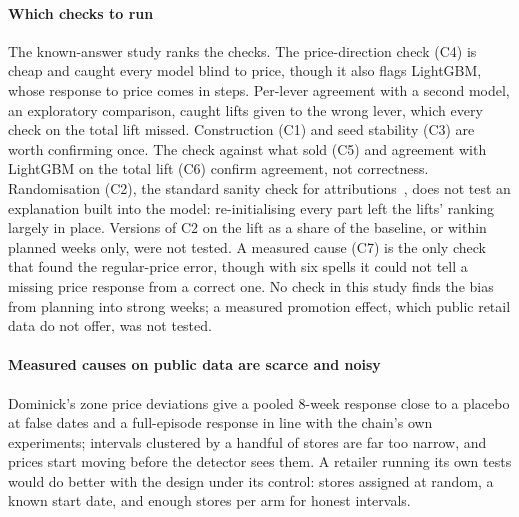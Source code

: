 \paragraph{Which checks to run}
The known-answer study ranks the checks. The price-direction check (C4) is cheap
and caught every model blind to price, though it also flags LightGBM, whose
response to price comes in steps. Per-lever agreement with a second model, an
exploratory comparison, caught lifts given to the wrong lever, which every
check on the total lift missed. Construction (C1) and seed stability (C3) are
worth confirming once. The check against what sold (C5) and agreement with
LightGBM on the total lift (C6) confirm agreement, not correctness.
Randomisation (C2), the standard sanity check for
attributions~\cite{adebayo2018}, does not test an explanation built into the
model: re-initialising every part left the lifts' ranking largely in place.
Versions of C2 on the lift as a share of the baseline, or within planned weeks
only, were not tested. A measured cause (C7) is the only check that found the
regular-price error, though with six spells it could not tell a missing price
response from a correct one. No check in this study finds the bias from
planning into strong weeks; a measured promotion effect, which public retail
data do not offer, was not tested.

\paragraph{Measured causes on public data are scarce and noisy}
Dominick's zone price deviations give a pooled 8-week response close to a
placebo at false dates and a full-episode response in line with the chain's
own experiments; intervals clustered by a handful of stores are far too narrow,
and prices start moving before the detector sees them. A retailer running its
own tests would do better with the design under its control: stores assigned at
random, a known start date, and enough stores per arm for honest intervals.

